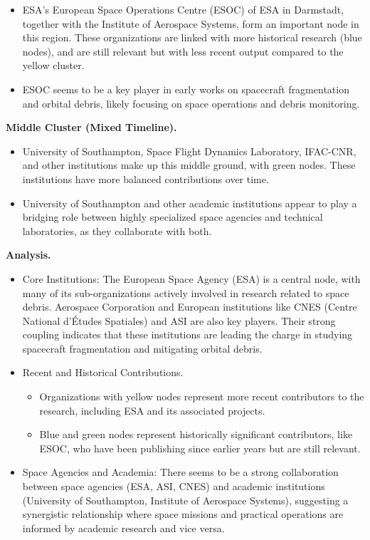 \documentclass[journal ]{new-aiaa}
\begin{document}
\begin{itemize}
    \item ESA's European Space Operations Centre (ESOC) of ESA in Darmstadt, together with the Institute of Aerospace Systems, form an important node in this region. These organizations are linked with more historical research (blue nodes), and are still relevant but with less recent output compared to the yellow cluster.
    \item ESOC seems to be a key player in early works on spacecraft fragmentation and orbital debris, likely focusing on space operations and debris monitoring.
\end{itemize}

\textbf{Middle Cluster (Mixed Timeline).}

\begin{itemize}
    \item University of Southampton, Space Flight Dynamics Laboratory, IFAC-CNR, and other institutions make up this middle ground, with green nodes. These institutions have more balanced contributions over time.
    \item University of Southampton and other academic institutions appear to play a bridging role between highly specialized space agencies and technical laboratories, as they collaborate with both.
\end{itemize}

\textbf{Analysis.}
\begin{itemize}
    \item Core Institutions: The European Space Agency (ESA) is a central node, with many of its sub-organizations actively involved in research related to space debris. Aerospace Corporation and European institutions like CNES (Centre National d'Études Spatiales) and ASI are also key players. Their strong coupling indicates that these institutions are leading the charge in studying spacecraft fragmentation and mitigating orbital debris.
    \item Recent and Historical Contributions.
    \begin{itemize}
        \item Organizations with yellow nodes represent more recent contributors to the research, including ESA and its associated projects.
        \item Blue and green nodes represent historically significant contributors, like ESOC, who have been publishing since earlier years but are still relevant.
    \end{itemize}
    \item Space Agencies and Academia: There seems to be a strong collaboration between space agencies (ESA, ASI, CNES) and academic institutions (University of Southampton, Institute of Aerospace Systems), suggesting a synergistic relationship where space missions and practical operations are informed by academic research and vice versa.
\end{itemize}
\end{document}
